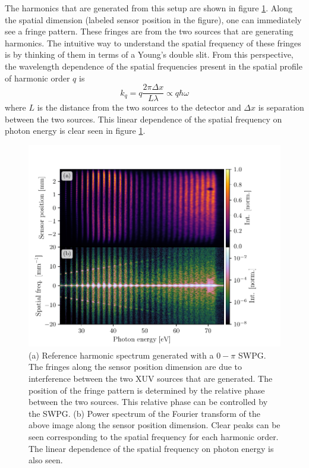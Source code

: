 The harmonics that are generated from this setup are shown in figure \ref{fig:ref_img_pow_spec}. Along the spatial dimension (labeled sensor position in the figure), one can immediately see a fringe pattern.  These fringes are from the two sources that are generating harmonics.  The intuitive way to understand the spatial frequency of these fringes is by thinking of them in terms of a Young's double slit.  From this perspective, the wavelength dependence of the spatial frequencies present in the spatial profile of harmonic order $q$ is
\begin{equation}
	k_q=q\frac{2\pi \Delta x}{L \lambda}\propto q\hbar\omega
\end{equation} 
where $L$ is the distance from the two sources to the detector and $\Delta x$ is separation between the two sources.  This linear dependence of the spatial frequency on photon energy is clear seen in figure \ref{fig:ref_img_pow_spec}.
\begin{figure}
	\centering
	\includegraphics[width=1.0\textwidth]{figures/Two_source/ref_img_pow_spec.pdf}
	\caption{(a) Reference harmonic spectrum generated with a $0-\pi$ SWPG. The fringes along the sensor position dimension are due to interference between the two XUV sources that are generated.  The position of the fringe pattern is determined by the relative phase between the two sources.  This relative phase can be controlled by the SWPG. (b) Power spectrum of the Fourier transform of the above image along the sensor position dimension. Clear peaks can be seen corresponding to the spatial frequency for each harmonic order.  The linear dependence of the spatial frequency on photon energy is also seen.}
	\label{fig:ref_img_pow_spec}
\end{figure}

